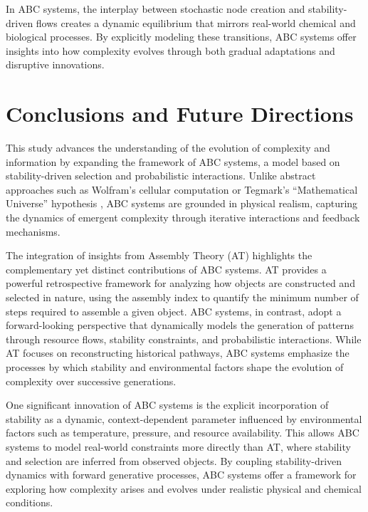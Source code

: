 \documentclass[entropy,article,submit,pdftex,oneauthor]{Definitions/mdpi}
\begin{document}
In ABC systems, the interplay between stochastic node creation and stability-driven flows creates a dynamic equilibrium that mirrors real-world chemical and biological processes. By explicitly modeling these transitions, ABC systems offer insights into how complexity evolves through both gradual adaptations and disruptive innovations.


\section{Conclusions and Future Directions}

This study advances the understanding of the evolution of complexity and information by expanding the framework of ABC systems, a model based on stability-driven selection and probabilistic interactions. Unlike abstract approaches such as Wolfram’s cellular computation \cite{wolfram2020fundamental} or Tegmark’s “Mathematical Universe” hypothesis \cite{tegmark2008mathematical}, ABC systems are grounded in physical realism, capturing the dynamics of emergent complexity through iterative interactions and feedback mechanisms.

The integration of insights from Assembly Theory (AT) \cite{walker2023nature} highlights the complementary yet distinct contributions of ABC systems. AT provides a powerful retrospective framework for analyzing how objects are constructed and selected in nature, using the assembly index to quantify the minimum number of steps required to assemble a given object. ABC systems, in contrast, adopt a forward-looking perspective that dynamically models the generation of patterns through resource flows, stability constraints, and probabilistic interactions. While AT focuses on reconstructing historical pathways, ABC systems emphasize the processes by which stability and environmental factors shape the evolution of complexity over successive generations. 

One significant innovation of ABC systems is the explicit incorporation of stability as a dynamic, context-dependent parameter influenced by environmental factors such as temperature, pressure, and resource availability. This allows ABC systems to model real-world constraints more directly than AT, where stability and selection are inferred from observed objects. By coupling stability-driven dynamics with forward generative processes, ABC systems offer a framework for exploring how complexity arises and evolves under realistic physical and chemical conditions.
\end{document}
